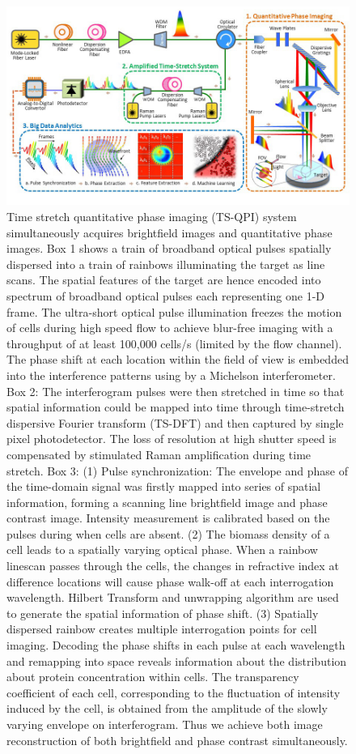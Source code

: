 \documentclass[aps,pra,preprint,superscriptaddress]{revtex4-1}
\begin{document}
\begin{figure}
\includegraphics[scale=0.55]{FigureSetup.jpg}
\caption{\label{fig:Setup} Time stretch quantitative phase imaging (TS-QPI) system simultaneously acquires brightfield images and quantitative phase images. Box 1 shows a train of broadband optical pulses spatially dispersed into a train of rainbows illuminating the target as line scans. The spatial features of the target are hence encoded into spectrum of broadband optical pulses each representing one 1-D frame. The ultra-short optical pulse illumination freezes the motion of cells during high speed flow to achieve blur-free imaging with a throughput of at least 100,000 cells/s (limited by the flow channel). The phase shift at each location within the field of view is embedded into the interference patterns using by a Michelson interferometer. Box 2: The interferogram pulses were then stretched in time so that spatial information could be mapped into time through time-stretch dispersive Fourier transform (TS-DFT) and then captured by single pixel photodetector. The loss of resolution at high shutter speed is compensated by stimulated Raman amplification during time stretch. Box 3: (1) Pulse synchronization: The envelope and phase of the time-domain signal was firstly mapped into series of spatial information, forming a scanning line brightfield image and phase contrast image. Intensity measurement is calibrated based on the pulses during when cells are absent. (2) The biomass density of a cell leads to a spatially varying optical phase. When a rainbow linescan passes through the cells, the changes in refractive index at difference locations will cause phase walk-off at each interrogation wavelength. Hilbert Transform and unwrapping algorithm are used to generate the spatial information of phase shift. (3) Spatially dispersed rainbow creates multiple interrogation points for cell imaging. Decoding the phase shifts in each pulse at each wavelength and remapping into space reveals information about the distribution about protein concentration within cells. The transparency coefficient of each cell, corresponding to the fluctuation of intensity induced by the cell, is obtained from the amplitude of the slowly varying envelope on interferogram. Thus we achieve both image reconstruction of both brightfield and phase contrast simultaneously.}
\end{figure}
\end{document}
